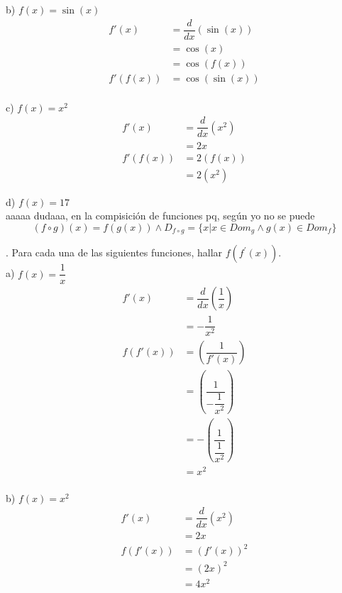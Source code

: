 \documentclass[letterpaper]{article}
\newcommand{\fp}[1]{#1^{\prime}}
\newcommand{\de}{\dfrac{d}{dx}}
\begin{document}
b) $ f(x) = \sin(x) $\\

\begin{align*}
	f'(x) &= \de (\sin(x))\\
	&= \cos(x)\\
	&= \cos(f(x))\\
	f'(f(x))&= \cos(\sin(x))\\
\end{align*}

c) $ f(x) = x^{2} $\\

\begin{align*}
	f'(x) &= \de \left( x^2 \right)\\
	&= 2x\\
	f'(f(x)) &= 2(f(x))\\
	&= 2(x^{2})
\end{align*}

d) $ f(x) = 17 $\\

aaaaa dudaaa, en la compisición de funciones pq, según yo no se puede
\[
(f \circ g) (x) = f(g(x)) \land D_{f\circ g} = \{ x | x \in Dom_g \land g(x) \in Dom_f \}
\]

. Para cada una de las siguientes funciones, hallar $ f(\fp{f} (x)) $.\\

a) $ f(x) = \dfrac{1}{x} $\\

\begin{align*}
	f'(x) &= \de \left( \dfrac{1}{x} \right)\\
	&= - \dfrac{1}{x^2}\\
	f(f'(x)) &= \left( \dfrac{1}{f'(x)} \right)\\
	&= \left( \dfrac{1}{- \dfrac{1}{x^2}} \right)\\
	&= -\left( \dfrac{1}{\dfrac{1}{x^2}} \right)\\
	&= x^{2}\\
\end{align*}

b) $ f(x) = x^{2} $\\

\begin{align*}
	f'(x)&= \de \left( x^{2} \right)\\
	&= 2x\\
	f(f'(x))&= (f'(x))^2\\
	&= (2x)^{2}\\
	&= 4x^{2}\\
\end{align*}
\end{document}
